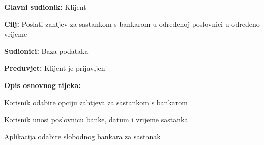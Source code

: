     		
    		
    			
    		     \noindent {}
    			\begin{packed_item}
    				
    				\item \textbf{Glavni sudionik: }Klijent
    				\item  \textbf{Cilj:} Poslati zahtjev za sastankom s bankarom u određenoj poslovnici u određeno vrijeme
    				\item  \textbf{Sudionici:} Baza podataka
    				\item  \textbf{Preduvjet:} Klijent je prijavljen
    				\item  \textbf{Opis osnovnog tijeka:}
    				
    				\item[] \begin{packed_enum}
    					
    					\item Korisnik odabire opciju zahtjeva za sastankom s bankarom
    					\item Korisnik unosi poslovnicu banke, datum i vrijeme sastanka
    					\item Aplikacija odabire slobodnog bankara za sastanak 
    					
    					
    					
    					
    				\end{packed_enum}
    				
    				
    			\end{packed_item}
    		
